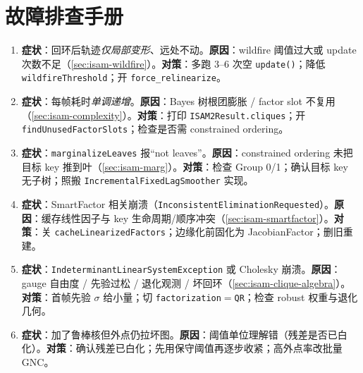 \section*{故障排查手册}
\begin{enumerate}
  \item \textbf{症状}：回环后轨迹\emph{仅局部变形}、远处不动。\textbf{原因}：wildfire 阈值过大或 update 次数不足（\cref{sec:isam-wildfire}）。\textbf{对策}：多跑 $3$--$6$ 次空 \texttt{update()}；降低 \texttt{wildfireThreshold}；开 \texttt{force\_relinearize}。
  \item \textbf{症状}：每帧耗时\emph{单调递增}。\textbf{原因}：Bayes 树根团膨胀 / factor slot 不复用（\cref{sec:isam-complexity}）。\textbf{对策}：打印 \texttt{ISAM2Result.\allowbreak cliques}；开 \texttt{findUnusedFactorSlots}；检查是否需 constrained ordering。
  \item \textbf{症状}：\texttt{marginalizeLeaves} 报“not leaves”。\textbf{原因}：constrained ordering 未把目标 key 推到叶（\cref{sec:isam-marg}）。\textbf{对策}：检查 Group 0/1；确认目标 key 无子树；照搬 \texttt{IncrementalFixedLagSmoother} 实现。
  \item \textbf{症状}：SmartFactor 相关崩溃（\texttt{InconsistentEliminationRequested}）。\textbf{原因}：缓存线性因子与 key 生命周期/顺序冲突（\cref{sec:isam-smartfactor}）。\textbf{对策}：关 \texttt{cacheLinearizedFactors}；边缘化前固化为 JacobianFactor；删旧重建。
  \item \textbf{症状}：\texttt{IndeterminantLinearSystemException} 或 Cholesky 崩溃。\textbf{原因}：gauge 自由度 / 先验过松 / 退化观测 / 坏回环（\cref{sec:isam-clique-algebra}）。\textbf{对策}：首帧先验 $\sigma$ 给小量；切 \texttt{factorization}$=$\texttt{QR}；检查 robust 权重与退化几何。
  \item \textbf{症状}：加了鲁棒核但外点仍拉坏图。\textbf{原因}：阈值单位理解错（残差是否已白化）。\textbf{对策}：确认残差已白化；先用保守阈值再逐步收紧；高外点率改批量 GNC。
\end{enumerate}
